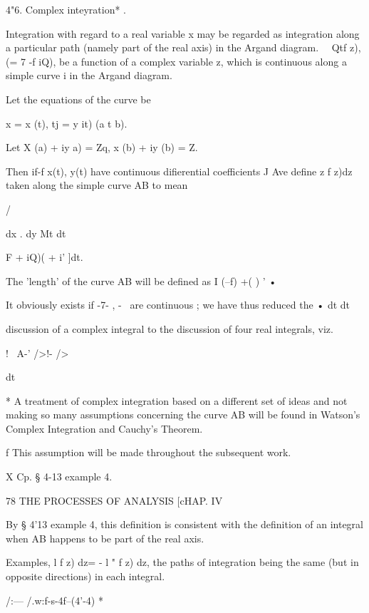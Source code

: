 4"6. Complex inteyration* .

Integration with regard to a real variable x may be regarded as
integration along a particular path (namely part of the real axis) in
the Argand diagram. \ \ Qtf z), (= 7 -f iQ), be a function of a
complex variable z, which is continuous along a simple curve i in the
Argand diagram.

Let the equations of the curve be

x = x (t), tj = y it) (a t b).

Let X (a) + iy a) = Zq, x (b) + iy (b) = Z.

Then if-f x(t), y(t) have continuous difierential coefficients J Ave
define z f z)dz taken along the simple curve AB to mean



/



dx . dy Mt dt



 F + iQ)( + i' ]dt.



The 'length' of the curve AB will be defined as I \/ (--f) +( ) ' •

It obviously exists if -7- , -~ are continuous ; we have thus reduced
the • dt dt

discussion of a complex integral to the discussion of four real
integrals, viz.



! \ A-' />!- />



dt



* A treatment of complex integration based on a different set of ideas
and not making so many assumptions concerning the curve AB will be
found in Watson's Complex Integration and Cauchy's Theorem.

f This assumption will be made throughout the subsequent work.

X Cp. § 4-13 example 4.



78 THE PROCESSES OF ANALYSIS [cHAP. IV

By § 4'13 example 4, this definition is consistent with the definition
of an integral when AB happens to be part of the real axis.

Examples, l f z) dz= - l " f z) dz, the paths of integration being the
same (but in opposite directions) in each integral.

/:— /.w:f-s-4f--(4'-4) *\

